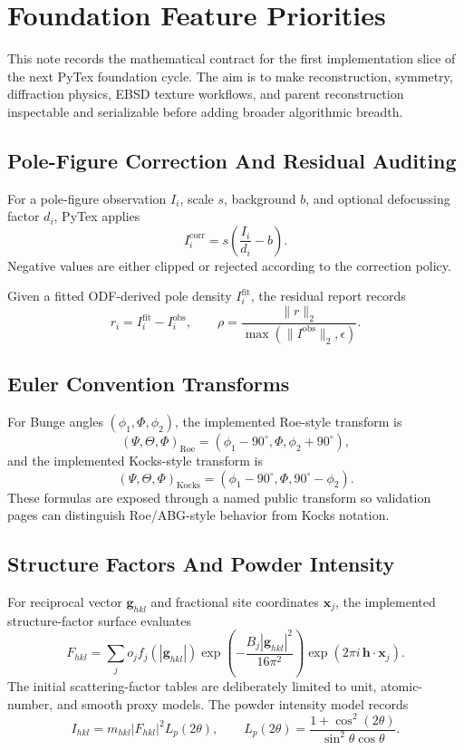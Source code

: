 \section{Foundation Feature Priorities}

This note records the mathematical contract for the first implementation slice of the next PyTex
foundation cycle. The aim is to make reconstruction, symmetry, diffraction physics, EBSD texture
workflows, and parent reconstruction inspectable and serializable before adding broader algorithmic
breadth.

\subsection{Pole-Figure Correction And Residual Auditing}

For a pole-figure observation $I_i$, scale $s$, background $b$, and optional defocussing factor
$d_i$, PyTex applies
\[
I_i^{\mathrm{corr}} = s\left(\frac{I_i}{d_i} - b\right).
\]
Negative values are either clipped or rejected according to the correction policy.

Given a fitted ODF-derived pole density $I_i^{\mathrm{fit}}$, the residual report records
\[
r_i = I_i^{\mathrm{fit}} - I_i^{\mathrm{obs}},
\qquad
\rho = \frac{\|r\|_2}{\max(\|I^{\mathrm{obs}}\|_2,\epsilon)}.
\]

\subsection{Euler Convention Transforms}

For Bunge angles $(\phi_1,\Phi,\phi_2)$, the implemented Roe-style transform is
\[
(\Psi,\Theta,\Phi)_{\mathrm{Roe}}
=
(\phi_1 - 90^\circ,\Phi,\phi_2 + 90^\circ),
\]
and the implemented Kocks-style transform is
\[
(\Psi,\Theta,\Phi)_{\mathrm{Kocks}}
=
(\phi_1 - 90^\circ,\Phi,90^\circ-\phi_2).
\]
These formulas are exposed through a named public transform so validation pages can distinguish
Roe/ABG-style behavior from Kocks notation.

\subsection{Structure Factors And Powder Intensity}

For reciprocal vector $\mathbf{g}_{hkl}$ and fractional site coordinates $\mathbf{x}_j$, the
implemented structure-factor surface evaluates
\[
F_{hkl}
=
\sum_j o_j f_j(|\mathbf{g}_{hkl}|)
\exp\!\left(-\frac{B_j|\mathbf{g}_{hkl}|^2}{16\pi^2}\right)
\exp\!\left(2\pi i\,\mathbf{h}\cdot\mathbf{x}_j\right).
\]
The initial scattering-factor tables are deliberately limited to unit, atomic-number, and smooth
proxy models. The powder intensity model records
\[
I_{hkl} = m_{hkl}|F_{hkl}|^2 L_p(2\theta),
\qquad
L_p(2\theta)=
\frac{1+\cos^2(2\theta)}{\sin^2\theta\cos\theta}.
\]


